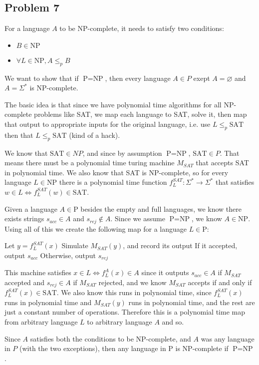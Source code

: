 \documentclass[english]{article}
\begin{document}
\subsection*{Problem 7}
For a language $A$ to be NP-complete, it needs to satisfy two conditions:
\begin{itemize}
\item $B \in \textrm{NP}$
\item $\forall L \in \textrm{NP}, A \le_p B$
\end{itemize}
We want to show that if $\textrm{P} = \textrm{NP}$, then every language
$A \in P$ exept $A = \varnothing$ and $A = \Sigma^*$ is NP-complete. 

The basic idea is that since we have polynomial time algorithms for all
NP-complete problems like SAT, we map each language to SAT, solve it, then map
that output to appropriate inputs for the original language, i.e. use
$L \le_p \textrm{SAT}$ then that $L \le_p \textrm{SAT}$ (kind of a hack). 

We know that $\textrm{SAT} \in NP$, and since by assumption
$\textrm{P} = \textrm{NP}$, $\textrm{SAT} \in P$. That means there must be a
polynomial time turing machine $M_{SAT}$ that accepts SAT in polynomial time.
We also know that SAT is NP-complete, so for every language $L \in \textrm{NP}$
there is a polynomial time function $f^{SAT}_L : \Sigma^* \rightarrow \Sigma^*$
that satisfies $w \in L \iff f^{SAT}_L(w) \in \textrm{SAT}$.

Given a language $A \in \textrm{P}$ besides the empty and full languages, we 
know there exists strings $s_{acc} \in A$ and $s_{rej} \notin A$. Since
we assume $\textrm{P} = \textrm{NP}$, we know $A \in \textrm{NP}$. Using all of
this we create the following map for a language $L \in \textrm{P}$:
\begin{algorithmic}
\State Let $y = f^{SAT}_L(x)$
\State Simulate $M_{SAT}(y)$, and record its output
\State If it accepted, output $s_{acc}$
\State Otherwise, output $s_{rej}$
\EndFunction 
\end{algorithmic}

This machine satisfies $x \in L \iff f^A_L(x) \in A$ since it outputs 
$s_{acc} \in A$ if $M_{SAT}$ accepted and $s_{rej} \in A$ if $M_{SAT}$
rejected, and we know $M_{SAT}$ accepts if and only if
$f^{SAT}_L(x) \in \textrm{SAT}$. We also know this runs in polynomial time,
since $f^{SAT}_L(x)$ runs in polynomial time and $M_{SAT}(y)$ runs in 
polynomial time, and the rest are just a constant number of operations.
Therefore this is a polynomial time map from arbitrary language $L$ to 
arbitrary language $A$ and so.

Since $A$ satisfies both the conditions to be NP-complete, and $A$ was 
any language in $P$ (with the two exceptions), then any language in P is
NP-complete if $\textrm{P} = \textrm{NP}$.
\end{document}

